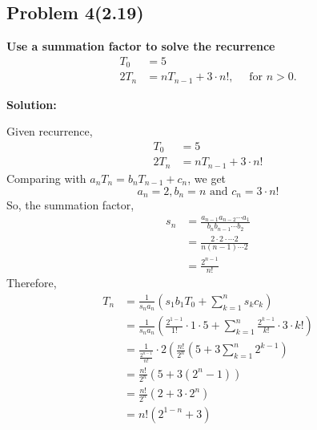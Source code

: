 \subsection{Problem 4(2.19)}
\textbf{Use a summation factor to solve the recurrence
$$
\begin{aligned}
T_0 & =5 \\
2 T_n & =n T_{n-1}+3 \cdot n !, \quad \text { for } n>0 .
\end{aligned}
$$}
\par

\begin{flushleft}
\textbf{Solution: }
\par
Given recurrence,
$$
\begin{aligned}
T_0 & =5 \\
2 T_n & =n T_{n-1}+3 \cdot n !
\end{aligned}
$$
Comparing with $a_n T_n=b_n T_{n-1}+c_n$, we get
$$
a_n=2, b_n=n \text { and } c_n=3 \cdot n !
$$
So, the summation factor,
$$
\begin{aligned}
s_n & =\frac{a_{n-1} a_{n-2} \cdots a_1}{b_n b_{n-1} \cdots b_2} \\
& =\frac{2 \cdot 2 \cdot \cdots 2}{n(n-1) \cdots 2} \\
& =\frac{2^{n-1}}{n !}
\end{aligned}
$$
Therefore,
$$
\begin{aligned}
T_n & =\frac{1}{s_n a_n}\left(s_1 b_1 T_0 + \sum_{k=1}^n s_k c_k\right) \\
& =\frac{1}{s_n a_n}\left(\frac{2^{1-1}}{1 !} \cdot 1 \cdot 5+\sum_{k=1}^n \frac{2^{k-1}}{k !} \cdot 3 \cdot k !\right) \\
& =\frac{1}{\frac{2^{n-1}}{n !}} \cdot 2\left(\frac{n !}{2^n}\left(5+3 \sum_{k=1}^n 2^{k-1}\right)\right. \\
& =\frac{n !}{2^n}\left(5+3\left(2^n-1\right)\right) \\
& =\frac{n !}{2^n}\left(2+3 \cdot 2^n\right) \\
& =n !\left(2^{1-n}+3\right) \quad
\end{aligned}
$$

\end{flushleft}



